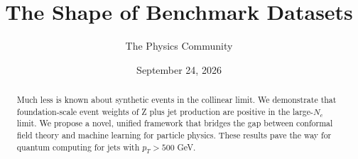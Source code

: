 \documentclass[11pt]{article}
\title{The Shape of Benchmark Datasets}
\author{The Physics Community}
\date{September 24, 2026}
\numberwithin{equation}{section}
\theoremstyle{definition}
\theoremstyle{remark}
\begin{document}
\maketitle
\begin{abstract}
Much less is known about synthetic events in the collinear limit. We
demonstrate that foundation-scale event weights of Z plus jet production
are positive in the large-$N_c$ limit. We propose a novel, unified
framework that bridges the gap between conformal field theory and
machine learning for particle physics. These results pave the way for
quantum computing for jets with $p_T > 500$ GeV.
\end{abstract}
\tableofcontents



\nocite{*}


\end{document}
